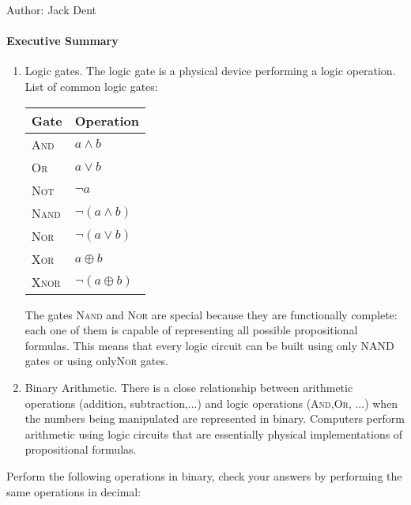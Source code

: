 \documentclass[solution, letterpaper]{cs20inclass}
\begin{document}

\noindent Author: Jack Dent%

\paragraph*{Executive Summary}
\begin{enumerate}

\item Logic gates. The logic gate is a physical device performing a logic operation. List of common logic gates:
\begin{table}[h]

\centering
\begin{tabular}{| l | l |}
\hline
Gate & Operation \\ \hline
\textsc{And} & $a \land b$ \\ \hline
\textsc{Or} & $a \lor b$ \\ \hline
\textsc{Not} & $\lnot a$ \\ \hline
\textsc{Nand} & $\lnot(a \land b)$ \\ \hline
\textsc{Nor} & $\lnot(a \lor b)$ \\ \hline
\textsc{Xor} & $a \oplus b$ \\ \hline
\textsc{Xnor} & $\lnot (a \oplus b)$ \\ \hline
\end{tabular}
\end{table}

The gates \textsc{Nand} and \textsc{Nor} are special because they are functionally complete: each one of them is capable of representing all possible propositional formulas. This means that every logic circuit can be built using only NAND gates or using only\textsc{Nor} gates. 

\item Binary Arithmetic. There is a close relationship between arithmetic operations (addition, subtraction,...) and logic operations (\textsc{And},\textsc{Or}, ...) when the numbers being manipulated are represented in binary. Computers perform arithmetic using logic circuits that are essentially physical implementations of propositional formulas.  

\end{enumerate}
\pagebreak

\problem
Perform the following operations in binary, check your answers by performing the same operations in decimal:
\end{document}
